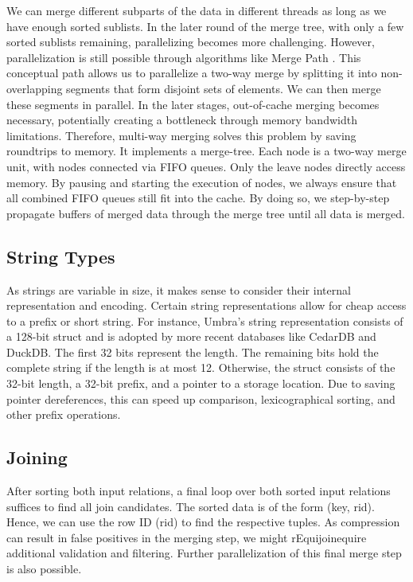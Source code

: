 We can merge different subparts of the data in different threads as long as we have enough
sorted sublists. In the later round of the merge tree, with only a few sorted sublists remaining,
parallelizing becomes more challenging. However, parallelization is still possible through
algorithms like Merge Path \cite{MergePath}. This conceptual path allows us to parallelize a two-way
merge by splitting it into non-overlapping segments that form disjoint sets of elements.
We can then merge these segments in parallel. In the later stages, out-of-cache merging becomes
necessary, potentially creating a bottleneck through memory bandwidth limitations. Therefore,
multi-way merging \cite{Balkesen,10.14778/1454159.1454171} solves this problem by saving roundtrips to memory. It implements a 
merge-tree. Each node is a two-way merge unit, with nodes connected via FIFO queues. 
Only the leave nodes directly access memory. By pausing and starting the execution of nodes,
we always ensure that all combined FIFO queues still fit into the cache. By doing so, we 
step-by-step propagate buffers of merged data through the merge tree until all data is merged.


\subsection{String Types}

As strings are variable in size, it makes sense to consider their internal representation and
encoding. Certain string representations allow for cheap access to a prefix or short string.
For instance, Umbra's string representation \cite{DBLP:conf/cidr/NeumannF20} consists of a 128-bit 
struct and is adopted by more recent databases like CedarDB and DuckDB. The first 32 bits represent 
the length. The remaining bits hold
the complete string if the length is at most 12. Otherwise, the struct consists of the 32-bit
length, a 32-bit prefix, and a pointer to a storage location. Due to saving pointer dereferences,
this can speed up comparison, lexicographical sorting, and other prefix operations.


\subsection{Joining}

After sorting both input relations, a final loop over both sorted input relations suffices to find all
join candidates. The sorted data is of the form (key, rid). Hence, we can use the row ID (rid) to
find the respective tuples. As compression can result in false positives in the merging step, we
might rEquijoinequire additional validation and 
filtering. Further parallelization of this final merge step is also possible.

